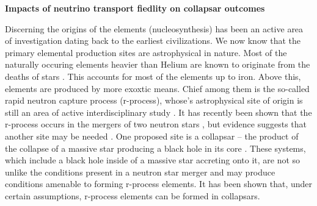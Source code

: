 \documentclass[12pt]{article}
\begin{document}
\setcounter{page}{1}  \renewcommand{\thepage}
           {\arabic{page} }%

\begin{center}
{\bf Impacts of neutrino transport fiedlity on collapsar outcomes} \vspace{-0.15in}
\end{center}




Discerning the origins of the elements (nucleosynthesis) has been an active area of investigation dating back to the earliest civilizations.
We now know that the primary elemental production sites are astrophysical in nature.
Most of the naturally occuring elements heavier than Helium are known to originate from the deaths of stars \citep{burbidge:1957}.
This accounts for most of the elements up to iron.
Above this, elements are produced by more exoxtic means.
Chief among them is the so-called rapid neutron capture process (r-process), whose's astrophysical site of origin is still an area of active interdisciplinary study \citep{horowitz:2019}.
It has recently been shown that the r-process occurs in the mergers of two neutron stars \citep{abbott:2017a}, but evidence suggests that another site may be needed \citep{martinez-pinedo:2014}.
One proposed site is a collapsar -- the product of the collapse of a massive star producing a black hole in its core \citep{siegel:2019}.
These systems, which include a black hole inside of a massive star accreting onto it, are not so unlike the conditions present in a neutron star merger and may produce conditions amenable to forming r-process elements.
It has been shown that, under certain assumptions, r-process elements can be formed in collapsars.
\end{document}
